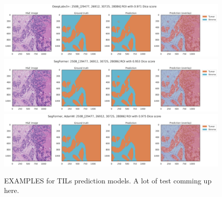 \begin{figure}
\includegraphics[width=\linewidth]{figures/tissue/deeplabv3+_dice_s_250B_[29477, 26912, 30725, 28086]_check.png}
\includegraphics[width=\linewidth]{figures/tissue/segformer_dice_s_250B_[29477, 26912, 30725, 28086]_check.png}
\includegraphics[width=\linewidth]{figures/tissue/segformer,_adamw_dice_s_250B_[29477, 26912, 30725, 28086]_check.png}

\caption{EXAMPLES for TILs prediction models. A lot of test comming up here.}
\label{fig:figure3}
\end{figure}

